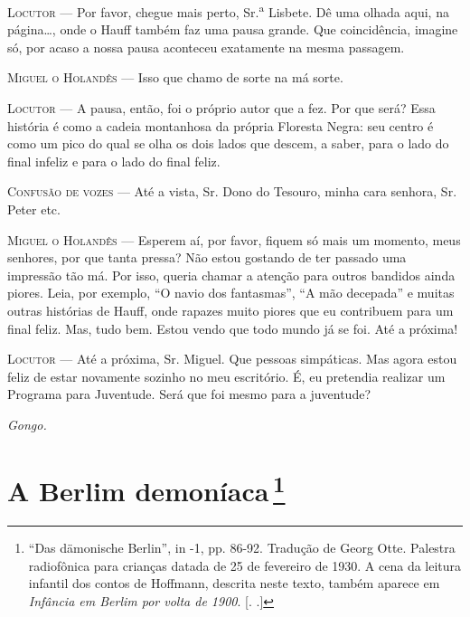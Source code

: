 \begin{myparindent}{0pt}
\begin{Parskip}
\textsc{Locutor} --- Por favor, chegue mais perto, Sr.\textsuperscript{a} Lisbete.
Dê uma olhada aqui, na página\ldots{}, onde o Hauff também faz uma pausa
grande. Que coincidência, imagine só, por acaso a nossa pausa aconteceu
exatamente na mesma passagem.

\textsc{Miguel o Holandês} --- Isso que chamo de sorte na má sorte.

\textsc{Locutor} --- A pausa, então, foi o próprio autor que a fez. Por que será?
Essa história é como a cadeia montanhosa da própria Floresta Negra: seu
centro é como um pico do qual se olha os dois lados que descem, a saber,
para o lado do final infeliz e para o lado do final feliz.

\textsc{Confusão de vozes} --- Até a vista, Sr. Dono do Tesouro, minha cara
senhora, Sr. Peter etc.

\textsc{Miguel o Holandês} --- Esperem aí, por favor, fiquem só mais um momento,
meus senhores, por que tanta pressa? Não estou gostando de ter passado
uma impressão tão má. Por isso, queria chamar a atenção para outros
bandidos ainda piores. Leia, por exemplo, ``O navio dos fantasmas'', ``A
mão decepada'' e muitas outras histórias de Hauff, onde rapazes muito
piores que eu contribuem para um final feliz. Mas, tudo bem. Estou vendo
que todo mundo já se foi. Até a próxima!

\textsc{Locutor} --- Até a próxima, Sr. Miguel. Que pessoas simpáticas. Mas agora
estou feliz de estar novamente sozinho no meu escritório. É, eu
pretendia realizar um Programa para Juventude. Será que foi mesmo para a
juventude?

\emph{Gongo.}
\end{Parskip}
\end{myparindent}

\chapter{A Berlim demoníaca\,\footnote[*]{``Das dämonische Berlin'',
  in  -1, pp. 86-92. Tradução de Georg Otte. Palestra radiofônica
  para crianças datada de 25 de fevereiro de 1930. A cena da leitura
  infantil dos contos de  Hoffmann, descrita neste texto, também
  aparece em \emph{Infância em Berlim por volta de 1900}. [. .]} }

